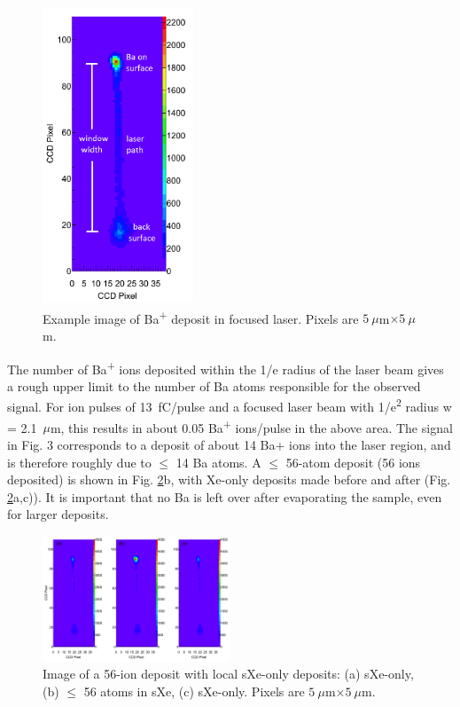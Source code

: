 \documentclass[aps,pra,reprint,superscriptaddress]{revtex4-1}
\begin{document}
\begin{figure}
\includegraphics[width=0.4\textwidth]{figures/raw_14-atom_labels.png}
\caption{Example image of Ba\textsuperscript{+} deposit in focused laser.  Pixels are $5~\mu$m$ \times 5~\mu$m.}
\label{fig:image_example}
\end{figure}

The number of Ba\textsuperscript{+} ions deposited within the 1/e radius of the laser beam gives a rough upper limit to the number of Ba atoms responsible for the observed signal.  For ion pulses of 13~fC/pulse and a focused laser beam with 1/e\textsuperscript{2} radius w = 2.1~$\mu$m, this results in about 0.05 Ba\textsuperscript{+} ions/pulse in the above area.  The signal in Fig. 3 corresponds to a deposit of about 14 Ba+ ions into the laser region, and is therefore roughly due to $\leq$ 14 Ba atoms.  A $\leq$ 56-atom deposit (56 ions deposited) is shown in Fig. \ref{fig:XeBaXe}b, with Xe-only deposits made before and after (Fig. \ref{fig:XeBaXe}a,c)).  It is important that no Ba is left over after evaporating the sample, even for larger deposits.

\begin{figure}
\includegraphics[width=0.5\textwidth]{figures/Xe-Ba-Xe_56-atom_71-73-74.png}
\caption{Image of a 56-ion deposit with local sXe-only deposits: (a) sXe-only, (b) $\leq$ 56 atoms in sXe, (c) sXe-only.  Pixels are $5~\mu$m$ \times 5~\mu$m.}
\label{fig:XeBaXe}
\end{figure}
\end{document}
